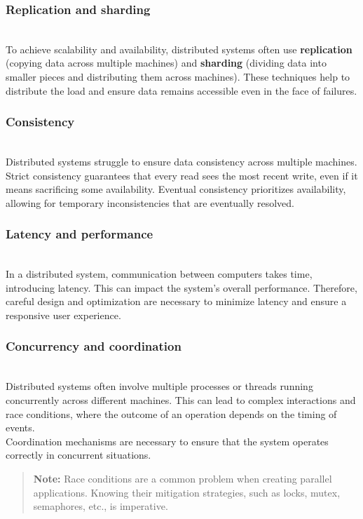 \subsubsection{Replication and sharding}\label{Y7U-eLcK5ipiofvFxsMoI}
\\
To achieve scalability and availability, distributed systems often use \textbf{replication} (copying data across multiple machines) and \textbf{sharding} (dividing data into smaller pieces and distributing them across machines). These techniques help to distribute the load and ensure data remains accessible even in the face of failures.

\subsubsection{Consistency}\label{fO9OT1daV9Gd_hGAGdy2w}
\\
Distributed systems struggle to ensure data consistency across multiple machines.
\\
Strict consistency guarantees that every read sees the most recent write, even if it means sacrificing some availability. Eventual consistency prioritizes availability, allowing for temporary inconsistencies that are eventually resolved.

\subsubsection{Latency and performance}\label{X-dvHyZOJEVC2MbWf7pi_}
\\
In a distributed system, communication between computers takes time, introducing latency. This can impact the system's overall performance. Therefore, careful design and optimization are necessary to minimize latency and ensure a responsive user experience.

\subsubsection{Concurrency and coordination}\label{xorjCJYBRoMcxWCnKnOpI}
\\
Distributed systems often involve multiple processes or threads running concurrently across different machines. This can lead to complex interactions and race conditions, where the outcome of an operation depends on the timing of events.
\\
Coordination mechanisms are necessary to ensure that the system operates correctly in concurrent situations.
\begin{quote}
\textbf{Note:} Race conditions are a common problem when creating parallel applications. Knowing their mitigation strategies, such as locks, mutex, semaphores, etc., is imperative.
\end{quote}
